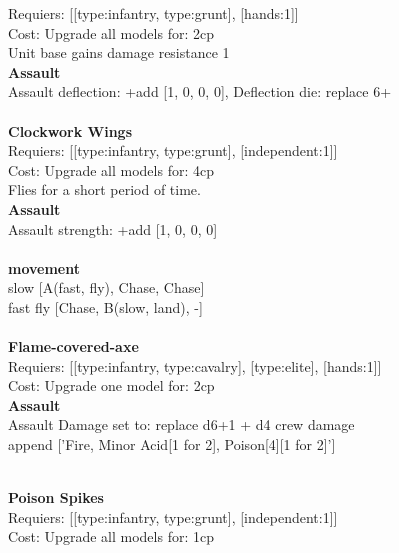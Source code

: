 Requiers: [[type:infantry, type:grunt], [hands:1]] \\
Cost: Upgrade all models for: 2cp \\
Unit base gains damage resistance 1\\ 




{\bf Assault} \ \\
Assault deflection: +add [1, 0, 0, 0], Deflection die: replace 6+
\\ 




\ \\
{\bf Clockwork Wings } \\

Requiers: [[type:infantry, type:grunt], [independent:1]] \\
Cost: Upgrade all models for: 4cp \\
Flies for a short period of time.\\ 




{\bf Assault} \ \\
Assault strength: +add [1, 0, 0, 0] 
\\ 



\ \\ {\bf movement } \\
slow [A(fast, fly), Chase, Chase] \\
fast fly [Chase, B(slow, land), -] \\

\ \\
{\bf Flame-covered-axe } \\

Requiers: [[type:infantry, type:cavalry], [type:elite], [hands:1]] \\
Cost: Upgrade one model for: 2cp \\




{\bf Assault} \ \\
Assault Damage set to: replace d6+1 + d4 crew damage
\\ 

append ['Fire, Minor Acid[1 for 2], Poison[4][1 for 2]']


\ \\
{\bf Poison Spikes } \\

Requiers: [[type:infantry, type:grunt], [independent:1]] \\
Cost: Upgrade all models for: 1cp \\




